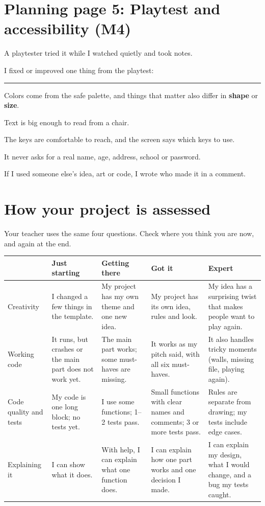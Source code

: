 \documentclass[level=2]{kidscode}
\begin{document}
\section{Planning page 5: Playtest and accessibility (M4)}
\begin{checklist}
  \item A playtester tried it while I watched quietly and took notes.
  \item I fixed or improved one thing from the playtest: \rule{4.5cm}{0.4pt}
  \item Colors come from the safe palette, and things that matter also differ in \textbf{shape} or \textbf{size}.
  \item Text is big enough to read from a chair.
  \item The keys are comfortable to reach, and the screen says which keys to use.
  \item It never asks for a real name, age, address, school or password.
  \item If I used someone else's idea, art or code, I wrote who made it in a comment.
\end{checklist}

\clearpage
\section{How your project is assessed}
Your teacher uses the same four questions. Check where you think you are now, and again at the
end.

{\small
\renewcommand{\arraystretch}{1.35}
\begin{longtable}{@{}>{\bfseries\raggedright\arraybackslash}p{2.3cm}>{\raggedright\arraybackslash}p{2.9cm}>{\raggedright\arraybackslash}p{2.9cm}>{\raggedright\arraybackslash}p{2.9cm}>{\raggedright\arraybackslash}p{3.0cm}@{}}
\toprule
 & Just starting & Getting there & Got it & Expert \\ \midrule\endhead
Creativity & I changed a few things in the template. & My project has my own theme and one new idea. & My project has its own idea, rules and look. & My idea has a surprising twist that makes people want to play again. \\ \midrule
Working code & It runs, but crashes or the main part does not work yet. & The main part works; some must-haves are missing. & It works as my pitch said, with all six must-haves. & It also handles tricky moments (walls, missing file, playing again). \\ \midrule
Code quality and tests & My code is one long block; no tests yet. & I use some functions; 1--2 tests pass. & Small functions with clear names and comments; 3 or more tests pass. & Rules are separate from drawing; my tests include edge cases. \\ \midrule
Explaining it & I can show what it does. & With help, I can explain what one function does. & I can explain how one part works and one decision I made. & I can explain my design, what I would change, and a bug my tests caught. \\
\bottomrule
\end{longtable}}
\end{document}
